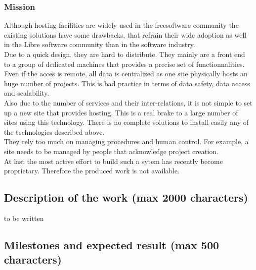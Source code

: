 \documentclass[a4paper,11pt]{report}
\begin{document}
\subsubsection{Mission}
Although hosting facilities are widely used in the freesoftware community the
existing solutions have some drawbacks, that refrain their wide adoption as
well in the Libre software community than in the software industry. \\
Due to a quick design, they are hard to distribute. They mainly are a front end
to a group of dedicated machines that provides a precise set of
functionnalities. Even if the acces is remote, all data is centralized as one
site physically hosts an huge number of projects. This is bad practice in terms
of data safety, data access and scalability. \\
Also due to the number of services and their inter-relations, it is not simple
to set up a new site that provides hosting. This is a real brake to a large
number of sites using this technology.  There is no complete solutions to
install easily any of the technologies described above. \\
They rely too much on managing procedures and human control. For example, a
site needs to be managed by people that acknowledge project creation. \\
At last the most active effort to build such a sytem has recently become
proprietary.  Therefore the produced work is not available. 
\subsection*{Description of the work (max 2000 characters)} to be written
\subsection*{Milestones and expected result (max 500 characters)}
\end{document}
